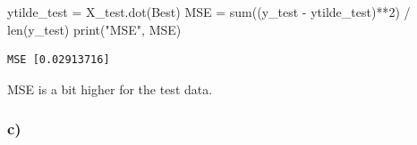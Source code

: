 \documentclass[
  letterpaper,
  DIV=11,
  numbers=noendperiod]{scrartcl}
\newenvironment{Shaded}{\begin{snugshade}}{\end{snugshade}}
\newcommand{\BuiltInTok}[1]{\textcolor[rgb]{0.00,0.23,0.31}{#1}}
\newcommand{\DecValTok}[1]{\textcolor[rgb]{0.68,0.00,0.00}{#1}}
\newcommand{\NormalTok}[1]{\textcolor[rgb]{0.00,0.23,0.31}{#1}}
\newcommand{\OperatorTok}[1]{\textcolor[rgb]{0.37,0.37,0.37}{#1}}
\newcommand{\StringTok}[1]{\textcolor[rgb]{0.13,0.47,0.30}{#1}}
\begin{document}
\begin{Shaded}
\begin{Highlighting}[]
\NormalTok{ytilde\_test }\OperatorTok{=}\NormalTok{ X\_test.dot(Best)}
\NormalTok{MSE }\OperatorTok{=} \BuiltInTok{sum}\NormalTok{((y\_test }\OperatorTok{{-}}\NormalTok{ ytilde\_test)}\OperatorTok{**}\DecValTok{2}\NormalTok{) }\OperatorTok{/} \BuiltInTok{len}\NormalTok{(y\_test)}
\BuiltInTok{print}\NormalTok{(}\StringTok{"MSE"}\NormalTok{, MSE)}
\end{Highlighting}
\end{Shaded}

\begin{verbatim}
MSE [0.02913716]
\end{verbatim}

MSE is a bit higher for the test data.

\hypertarget{c}{%
\subsubsection{c)}\label{c}}
\end{document}
